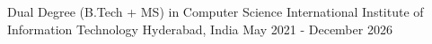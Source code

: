 
\begin{cventries}
  \cventry
    {Dual Degree (B.Tech + MS) in Computer Science} %
    {International Institute of Information Technology} %
    {Hyderabad, India} %
    {May 2021 - December 2026} %
    {}
\end{cventries}
